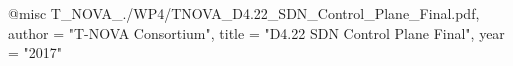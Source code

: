 @misc{ T_NOVA_./WP4/TNOVA_D4.22_SDN_Control_Plane_Final.pdf,
       author = "{T-NOVA Consortium}",
       title = "D4.22 SDN Control Plane Final",
       year = "2017" }
